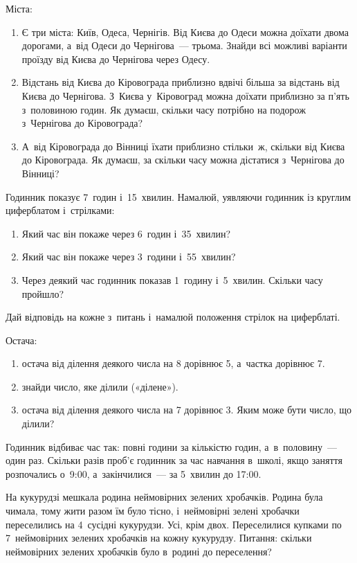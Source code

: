 \problem
Міста:
\begin{enumerate}
    \item Є три міста: Київ, Одеса, Чернігів.
    Від Києва до Одеси можна доїхати двома дорогами,
    а~від Одеси до Чернігова~--- трьома.
    Знайди всі можливі варіанти проїзду від Києва до Чернігова через Одесу.
    \item Відстань від Києва до Кіровограда приблизно вдвічі більша
    за відстань від Києва до Чернігова.
    З~Києва у~Кіровоград можна доїхати приблизно за п'ять з~половиною годин.
    Як думаєш, скільки часу потрібно на подорож з~Чернігова до Кіровограда?
    \item А~від Кіровограда до Вінниці їхати приблизно стільки~ж,
    скільки від Києва до Кіровограда.
    Як думаєш, за скільки часу можна дістатися з~Чернігова до Вінниці?
\end{enumerate}


\problem
Годинник показує 7~годин і~15~хвилин.
Намалюй, уявляючи годинник із круглим циферблатом і~стрілками:
\begin{enumerate}
    \item Який час він покаже через 6~годин і~35~хвилин?
    \item Який час він покаже через 3~години і~55~хвилин?
    \item Через деякий час годинник показав 1~годину і~5~хвилин.
    Скільки часу пройшло?
\end{enumerate}
Дай відповідь на кожне з~питань і~намалюй положення стрілок на циферблаті.


\problem
Остача:
\begin{enumerate}
    \item остача від ділення деякого числа на 8 дорівнює 5,
    а~частка дорівнює 7.
    \item знайди число, яке ділили («ділене»).
    \item остача від ділення деякого числа на 7 дорівнює 3.
    Яким може бути число, що ділили?
\end{enumerate}


\problem
Годинник відбиває час так: повні години за кількістю годин,
а~в~половину~--- один раз.
Скільки разів проб’є годинник за час навчання в~школі,
якщо заняття розпочались о~9:00, а~закінчилися~--- за 5~хвилин до 17:00.


\problem
На кукурудзі мешкала родина неймовірних зелених хробачків.
Родина була чимала, тому жити разом їм було тісно, і~неймовірні
зелені хробачки переселились на 4~сусідні кукурудзи. Усі, крім двох.
Переселилися купками по 7~неймовірних зелених хробачків на кожну кукурудзу.
Питання: скільки неймовірних зелених хробачків було в~родині до переселення?


